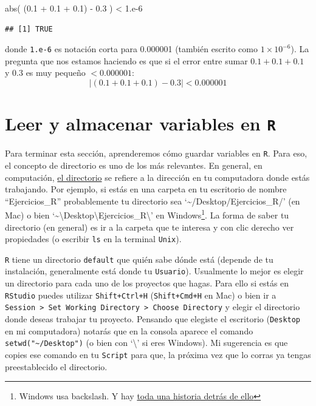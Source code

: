 \documentclass[]{tufte-book}
\newenvironment{Shaded}{}{}
\newcommand{\DecValTok}[1]{\textcolor[rgb]{0.25,0.63,0.44}{#1}}
\newcommand{\FloatTok}[1]{\textcolor[rgb]{0.25,0.63,0.44}{#1}}
\newcommand{\FunctionTok}[1]{\textcolor[rgb]{0.02,0.16,0.49}{#1}}
\newcommand{\NormalTok}[1]{#1}
\newcommand{\SpecialCharTok}[1]{\textcolor[rgb]{0.25,0.44,0.63}{#1}}
\begin{document}
\begin{Shaded}
\begin{Highlighting}[]
\FunctionTok{abs}\NormalTok{( (}\FloatTok{0.1} \SpecialCharTok{+} \FloatTok{0.1} \SpecialCharTok{+} \FloatTok{0.1}\NormalTok{) }\SpecialCharTok{{-}} \FloatTok{0.3}\NormalTok{ ) }\SpecialCharTok{\textless{}} \DecValTok{1}\NormalTok{.e}\DecValTok{{-}6}
\end{Highlighting}
\end{Shaded}

\begin{verbatim}
## [1] TRUE
\end{verbatim}

donde \texttt{1.e-6} es notación corta para 0.000001 (también escrito
como \(1\times 10^{-6}\)). La pregunta que nos estamos haciendo es que
si el error entre sumar \(0.1+0.1+0.1\) y \(0.3\) es muy pequeño
\(< 0.000001\): \[
| (0.1 + 0.1 + 0.1) - 0.3 | < 0.000001
\]

\hypertarget{leer-y-almacenar-variables-en-r}{%
\chapter{\texorpdfstring{Leer y almacenar variables en
\texttt{R}}{Leer y almacenar variables en R}}\label{leer-y-almacenar-variables-en-r}}

Para terminar esta sección, aprenderemos cómo guardar variables en
\texttt{R}. Para eso, el concepto de directorio es uno de los más
relevantes. En general, en computación,
\href{https://en.wikipedia.org/wiki/Working_directory}{el directorio} se
refiere a la dirección en tu computadora donde estás trabajando. Por
ejemplo, si estás en una carpeta en tu escritorio de nombre
``Ejercicios\_R'' probablemente tu directorio sea
`\textasciitilde/Desktop/Ejercicios\_R/' (en Mac) o bien
`\textasciitilde\textbackslash Desktop\textbackslash Ejercicios\_R\textbackslash{}'
en Windows\footnote{Windows usa backslash. Y hay
  \href{https://www.howtogeek.com/181774/why-windows-uses-backslashes-and-everything-else-uses-forward-slashes/}{toda
  una historia detrás de ello}}. La forma de saber tu directorio (en
general) es ir a la carpeta que te interesa y con clic derecho ver
propiedades (o escribir \texttt{ls} en la terminal \texttt{Unix}).

\texttt{R} tiene un directorio \texttt{default} que quién sabe dónde
está (depende de tu instalación, generalmente está donde tu
\texttt{Usuario}). Usualmente lo mejor es elegir un directorio para cada
uno de los proyectos que hagas. Para ello si estás en \texttt{RStudio}
puedes utilizar \texttt{Shift+Ctrl+H} (\texttt{Shift+Cmd+H} en Mac) o
bien ir a
\texttt{Session\ \textgreater{}\ Set\ Working\ Directory\ \textgreater{}\ Choose\ Directory}
y elegir el directorio donde deseas trabajar tu proyecto. Pensando que
elegiste el escritorio (\texttt{Desktop} en mi computadora) notarás que
en la consola aparece el comando
\texttt{setwd("\textasciitilde{}/Desktop")} (o bien con
`\textbackslash{}' si eres Windows). Mi sugerencia es que copies ese
comando en tu \texttt{Script} para que, la próxima vez que lo corras ya
tengas preestablecido el directorio.
\end{document}

